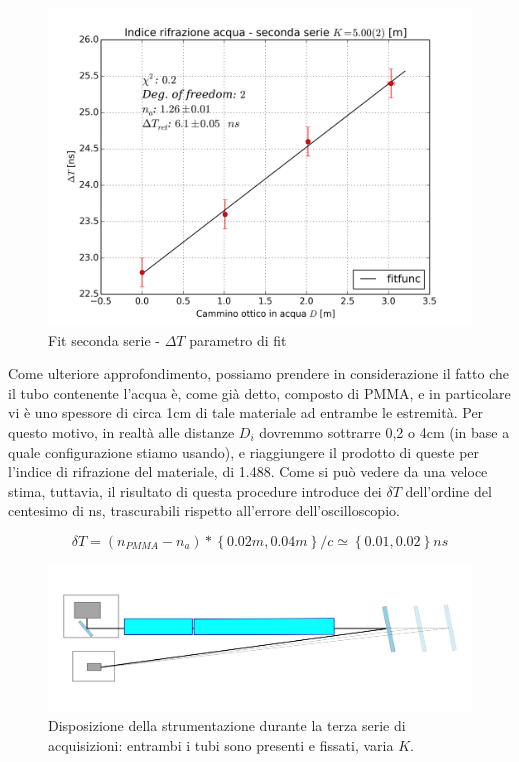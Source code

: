 \documentclass[journal, a4paper]{IEEEtran}
\begin{document}
\begin{figure}
\centering
\includegraphics[width=0.9\linewidth]{./indice_secondaserie_tret}
\caption{Fit seconda serie - $\Delta T$ parametro di fit}
\label{fig:indice_secondaserie_tret}
\end{figure}

Come ulteriore approfondimento, possiamo prendere in considerazione il fatto che il tubo contenente l'acqua è, come già detto, composto di PMMA, e in particolare vi è uno spessore di circa 1cm di tale materiale ad entrambe le estremità. Per questo motivo, in realtà alle distanze $D_i$ dovremmo sottrarre 0,2 o 4cm (in base a quale configurazione stiamo usando), e riaggiungere il prodotto di queste per l'indice di rifrazione del materiale, di 1.488. Come si può vedere da una veloce stima, tuttavia, il risultato di questa procedure introduce dei $\delta T$ dell'ordine del centesimo di ns, trascurabili rispetto all'errore dell'oscilloscopio.

\begin{equation}
\delta T = (n_{PMMA} - n_a)*\left\lbrace 0.02m, 0.04m\right\rbrace /c \simeq \left\lbrace 0.01, 0.02\right\rbrace ns
\end{equation}

\begin{figure}
\centering
\includegraphics[width=0.9\linewidth]{./disegn_terzaserie}
\caption{Disposizione della strumentazione durante la terza serie di acquisizioni: entrambi i tubi sono presenti e fissati, varia $K$.}
\label{fig:disegn_terzaserie}
\end{figure}
\end{document}

